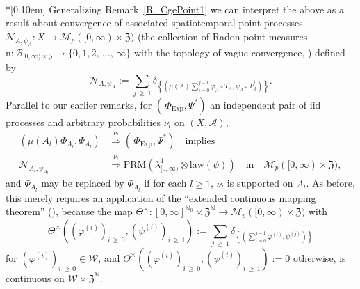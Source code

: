 \documentclass[AHL,Unicode,longabstracts]{cedram}
\newcommand{\clA}{\mathcal{A}}
\newcommand{\clB}{\mathcal{B}}
\newcommand{\clM}{\mathcal{M}}
\newcommand{\clW}{\mathcal{W}}
\newcommand{\clN}{\mathcal{N}}
\newcommand{\Expl}{\mathrm{Exp}}
\newcommand{\law}{\mathrm{law}}
\newcommand{\PRM}{\mathrm{PRM}}
\newcommand{\rmnn}{\mathrm{n}}
\newcommand{\frkZ}{\mathfrak{Z}}
\newcommand{\bbN}{\mathbb{N}}
\begin{document}
\pagebreak

\begin{rema}\label{R_CgeSpatoiTempPoint1}\ \\*[0.10em]
Generalizing Remark~\ref{R_CgePoint1} we can interpret the above as a result about convergence of associated spatiotemporal point processes $\clN_{A,\psi_{A}}:X\rightarrow\clM_{p}([0,\infty)\times\frkZ)$ (the collection of Radon point measures $\rmnn:\clB_{[0,\infty)\times\frkZ}\rightarrow
\{0,1,2,\,\ldots,\,\infty\}$ with the topology of vague convergence, \cite{Resnick}) defined by
\begin{equation}
\clN_{A,\psi_{A}}:= {\sum_{j\,\geq\,1}}
\delta_{\left\{\left(\mu(A)\sum\limits_{i=0}^{j-1}\varphi_{A}\circ T_{A}^{i},\psi_{A}\circ T_{A}^{j}\right)\right\}}.
\end{equation}
Parallel to our earlier remarks, for $(\,\Phi_{\Expl},\Psi^{\ast})$ an independent pair of iid processes and arbitrary probabilities $\nu_{l}$ on $(X,\clA)$,
\begin{equation}
\begin{split}
(\mu(A_{l})\Phi_{A_{l}},\Psi_{A_{l}}) &\overset{\nu_{l}}{\Longrightarrow} (\,\Phi_{\Expl},\Psi^{\ast})\quad\text{implies}\\
\clN_{A_{l},\psi_{A_{l}}} &\overset{\nu_{l}}{\Longrightarrow}
\PRM(\lambda_{\lbrack0,\infty)}^{1}\otimes\law(\psi))\quad\text{in}\quad\clM_{p}([0,\infty)\times\frkZ),
\end{split}
\end{equation}
and $\Psi_{A_{l}}$ may be replaced by $\widetilde{\Psi}_{A_{l}}$ if for each $l\geq1$, $\nu_{l}$ is supported on $A_{l}$. As before, this merely requires an application of the ``extended continuous mapping theorem'' (\cite[Theorem~2.7]{Bi}), because the map $\Theta^{\times}:[0,\infty]^{\bbN_{0}}\times\frkZ^{\bbN }\rightarrow\clM_{p}([0,\infty)\times\frkZ)$ with 
\[
\Theta ^{\times}\left(\left(\varphi^{(i)}\right)_{i\,\geq\,0},\left(\psi^{(i)}\right)_{i\,\geq\,1}\right):= {\sum_{j\,\geq\,1}}
\delta_{\left\{\left(\sum\limits_{i=0}^{j-1}\varphi^{(i)},\psi^{(j)}\right)\right\}}
\]
for $(\varphi ^{(i)})_{i\,\geq\,0}\in\clW$, and $\Theta^{\times}((\varphi^{(i)})_{i\,\geq\,0},(\psi^{(i)})_{i\,\geq\,1}):=0$ otherwise, is continuous on $\clW
\times\frkZ^{\bbN}$.
\end{rema}
\end{document}
